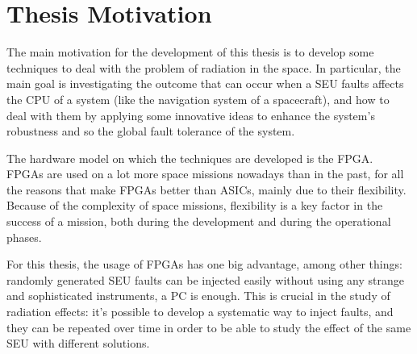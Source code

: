 \section{Thesis Motivation}
The main motivation for the development of this thesis is to develop some techniques to deal with the problem of radiation in the space. In particular, the main goal is investigating the outcome that can occur when a SEU faults affects the CPU of a system (like the navigation system of a spacecraft), and how to deal with them by applying some innovative ideas to enhance the system's robustness and so the global fault tolerance of the system. \bigskip

The hardware model on which the techniques are developed is the FPGA. FPGAs are used on a lot more space missions nowadays than in the past, for all the reasons that make FPGAs better than ASICs, mainly due to their flexibility. Because of the complexity of space missions, flexibility is a key factor in the success of a mission, both during the development and during the operational phases. \bigskip

For this thesis, the usage of FPGAs has one big advantage, among other things: randomly generated SEU faults can be injected easily without using any strange and sophisticated instruments, a PC is enough. This is crucial in the study of radiation effects: it's possible to develop a systematic way to inject faults, and they can be repeated over time in order to be able to study the effect of the same SEU with different solutions.

